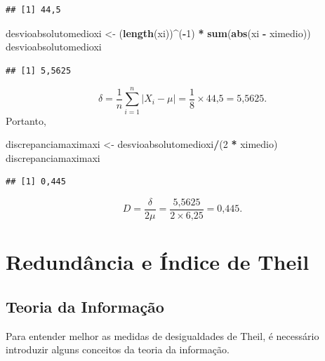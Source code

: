 \documentclass[
]{book}
\newenvironment{Shaded}{\begin{snugshade}}{\end{snugshade}}
\newcommand{\DecValTok}[1]{\textcolor[rgb]{0.00,0.00,0.81}{#1}}
\newcommand{\KeywordTok}[1]{\textcolor[rgb]{0.13,0.29,0.53}{\textbf{#1}}}
\newcommand{\NormalTok}[1]{#1}
\newcommand{\OperatorTok}[1]{\textcolor[rgb]{0.81,0.36,0.00}{\textbf{#1}}}
\newcommand{\StringTok}[1]{\textcolor[rgb]{0.31,0.60,0.02}{#1}}
\begin{document}
\begin{verbatim}
## [1] 44,5
\end{verbatim}

\begin{Shaded}
\begin{Highlighting}[]
\NormalTok{desvioabsolutomedioxi <-}\StringTok{ }\NormalTok{(}\KeywordTok{length}\NormalTok{(xi))}\OperatorTok{^}\NormalTok{(}\OperatorTok{-}\DecValTok{1}\NormalTok{) }\OperatorTok{*}\StringTok{ }\KeywordTok{sum}\NormalTok{(}\KeywordTok{abs}\NormalTok{(xi }\OperatorTok{-}\StringTok{ }
\StringTok{    }\NormalTok{ximedio))}
\NormalTok{desvioabsolutomedioxi}
\end{Highlighting}
\end{Shaded}

\begin{verbatim}
## [1] 5,5625
\end{verbatim}

\[
\delta = \dfrac{1}{n}\sum_{i=1}^{n}|X_i - \mu| = \dfrac{1}{\text{8}}\times \text{44,5} = \text{5,5625}.
\]
Portanto,

\begin{Shaded}
\begin{Highlighting}[]
\NormalTok{discrepanciamaximaxi <-}\StringTok{ }\NormalTok{desvioabsolutomedioxi}\OperatorTok{/}\NormalTok{(}\DecValTok{2} \OperatorTok{*}\StringTok{ }
\StringTok{    }\NormalTok{ximedio)}
\NormalTok{discrepanciamaximaxi}
\end{Highlighting}
\end{Shaded}

\begin{verbatim}
## [1] 0,445
\end{verbatim}

\[
  D = \dfrac{\delta}{2\mu} = \dfrac{\text{5,5625}}{2 \times \text{6,25}} = \text{0,445}.
\]

\hypertarget{redunduxe2ncia-e-uxedndice-de-theil}{%
\section{Redundância e Índice de Theil}\label{redunduxe2ncia-e-uxedndice-de-theil}}

\hypertarget{teoria-da-informauxe7uxe3o}{%
\subsection{Teoria da Informação}\label{teoria-da-informauxe7uxe3o}}

Para entender melhor as medidas de desigualdades de Theil, é necessário introduzir alguns conceitos da teoria da informação.
\end{document}
